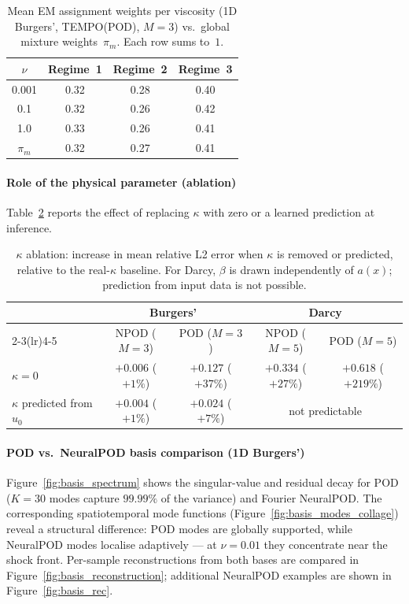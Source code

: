 \documentclass[preprint,10pt]{elsarticle}
\begin{document}
\begin{table}[h]
\centering
\small
\setlength{\tabcolsep}{14pt}
\caption{Mean EM assignment weights per viscosity (1D Burgers',
  TEMPO(POD), $M{=}3$) vs.\ global mixture weights~$\pi_m$.
  Each row sums to~$1$.}
\label{tab:gating}
\begin{tabular}{c c c c}
\toprule
$\nu$ & Regime~1 & Regime~2 & Regime~3 \\
\midrule
0.001 & 0.32 & 0.28 & 0.40 \\
0.1   & 0.32 & 0.26 & 0.42 \\
1.0   & 0.33 & 0.26 & 0.41 \\
\midrule
$\pi_m$ & 0.32 & 0.27 & 0.41 \\
\bottomrule
\end{tabular}
\end{table}

\paragraph{Role of the physical parameter (ablation)}\label{app:kappa_abl}
Table~\ref{tab:kappa_abl} reports the effect of replacing $\kappa$ with zero or a learned prediction at inference.

\begin{table}[h]
\centering
\footnotesize
\setlength{\tabcolsep}{4pt}
\caption{$\kappa$ ablation: increase in mean relative L2 error when $\kappa$ is removed or predicted, relative to the real-$\kappa$ baseline.
  For Darcy, $\beta$ is drawn independently of $a(x)$; prediction from input data is not possible.}
\label{tab:kappa_abl}
\begin{tabular}{l c c c c}
\toprule
 & \multicolumn{2}{c}{Burgers'} & \multicolumn{2}{c}{Darcy} \\
\cmidrule(lr){2-3}\cmidrule(lr){4-5}
 & NPOD ($M{=}3$) & POD ($M{=}3$) & NPOD ($M{=}5$) & POD ($M{=}5$) \\
\midrule
$\kappa = 0$ & $+0.006$ ($+1\%$) & $+0.127$ ($+37\%$) & $+0.334$ ($+27\%$) & $+0.618$ ($+219\%$) \\
$\kappa$ predicted from $u_0$ & $+0.004$ ($+1\%$) & $+0.024$ ($+7\%$) & \multicolumn{2}{c}{not predictable} \\
\bottomrule
\end{tabular}
\end{table}

\paragraph{POD vs.\ NeuralPOD basis comparison (1D Burgers')}
Figure~\ref{fig:basis_spectrum} shows the singular-value and residual decay for POD ($K{=}30$ modes capture $99.99\%$ of the variance) and Fourier NeuralPOD.
The corresponding spatiotemporal mode functions (Figure~\ref{fig:basis_modes_collage}) reveal a structural difference: POD modes are globally supported, while NeuralPOD modes localise adaptively — at $\nu{=}0.01$ they concentrate near the shock front.
Per-sample reconstructions from both bases are compared in Figure~\ref{fig:basis_reconstruction}; additional NeuralPOD examples are shown in Figure~\ref{fig:basis_rec}.
\end{document}
